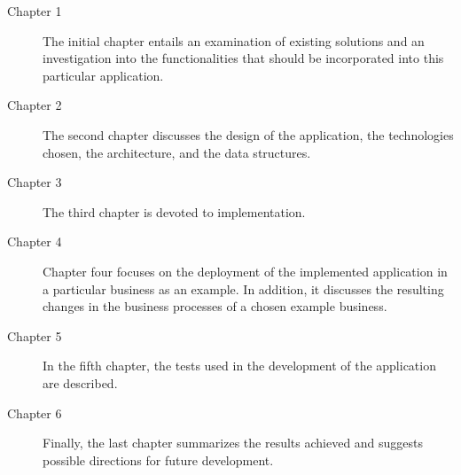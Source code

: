 \begin{description}
\item[Chapter 1] The initial chapter entails an examination of existing solutions and an investigation into the functionalities that should be incorporated into this particular application.

\item[Chapter 2] The second chapter discusses the design of the application, the technologies chosen, the architecture, and the data structures.

\item[Chapter 3] The third chapter is devoted to implementation.

\item[Chapter 4] Chapter four focuses on the deployment of the implemented application in a particular business as an example. In addition, it discusses the resulting changes in the business processes of a chosen example business.

\item[Chapter 5] In the fifth chapter, the tests used in the development of the application are described.

\item[Chapter 6] Finally, the last chapter summarizes the results achieved and suggests possible directions for future development.
\end{description}